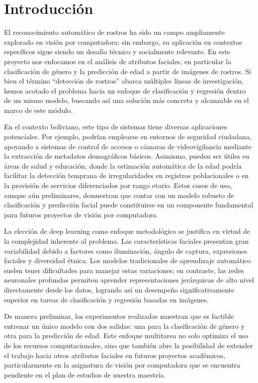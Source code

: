 \section{Introducción}
El reconocimiento automático de rostros ha sido un campo ampliamente explorado en visión por computadora; 
sin embargo, su aplicación en contextos específicos sigue siendo un desafío técnico y socialmente relevante. 
En este proyecto nos enfocamos en el análisis de atributos faciales, 
en particular la clasificación de género y la predicción de edad a partir de imágenes de rostros. 
Si bien el término “detección de rostros” abarca múltiples líneas de investigación, 
hemos acotado el problema hacia un enfoque de clasificación y regresión dentro de un mismo modelo, 
buscando así una solución más concreta y alcanzable en el marco de este módulo.

En el contexto boliviano, este tipo de sistemas tiene diversas aplicaciones potenciales. 
Por ejemplo, podrían emplearse en entornos de seguridad ciudadana, 
apoyando a sistemas de control de accesos o cámaras de videovigilancia mediante la extracción de metadatos demográficos básicos. 
Asimismo, pueden ser útiles en áreas de salud y educación, 
donde la estimación automática de la edad podría facilitar la detección temprana de irregularidades en registros poblacionales 
o en la provisión de servicios diferenciados por rango etario. 
Estos casos de uso, aunque aún preliminares, demuestran que contar con un modelo robusto de clasificación y 
predicción facial puede constituirse en un componente fundamental para futuros proyectos de visión por computadora.

La elección de deep learning como enfoque metodológico se justifica en virtud de la complejidad inherente al problema. 
Las características faciales presentan gran variabilidad debido a factores como iluminación, ángulo de captura, 
expresiones faciales y diversidad étnica. Los modelos tradicionales de aprendizaje automático suelen tener dificultades 
para manejar estas variaciones; en contraste, las redes neuronales profundas permiten aprender representaciones jerárquicas 
de alto nivel directamente desde los datos, logrando así un desempeño significativamente superior en tareas de clasificación y 
regresión basadas en imágenes.

De manera preliminar, los experimentos realizados muestran que es factible entrenar un único modelo con dos salidas:
una para la clasificación de género y otra para la predicción de edad. 
Este enfoque multitarea no solo optimiza el uso de los recursos computacionales, 
sino que también abre la posibilidad de extender el trabajo hacia otros atributos faciales en futuros proyectos académicos, 
particularmente en la asignatura de visión por computadora que se encuentra pendiente en el plan de estudios de nuestra maestría.